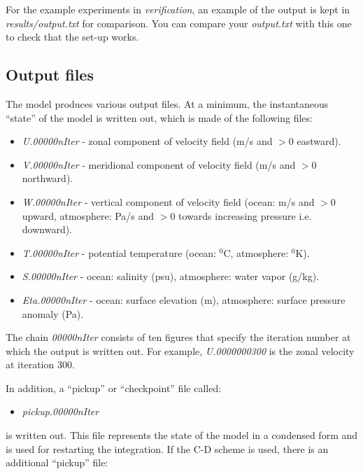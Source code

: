 For the example experiments in {\em verification}, an example of the
output is kept in {\em results/output.txt} for comparison. You can compare
your {\em output.txt} with this one to check that the set-up works.



\subsection{Output files}

The model produces various output files. At a minimum, the instantaneous
``state'' of the model is written out, which is made of the following files:

\begin{itemize}
\item \textit{U.00000nIter} - zonal component of velocity field (m/s and $>
0 $ eastward).

\item \textit{V.00000nIter} - meridional component of velocity field (m/s
and $> 0$ northward).

\item \textit{W.00000nIter} - vertical component of velocity field (ocean:
m/s and $> 0$ upward, atmosphere: Pa/s and $> 0$ towards increasing pressure
i.e. downward).

\item \textit{T.00000nIter} - potential temperature (ocean: $^{0}$C,
atmosphere: $^{0}$K).

\item \textit{S.00000nIter} - ocean: salinity (psu), atmosphere: water vapor
(g/kg).

\item \textit{Eta.00000nIter} - ocean: surface elevation (m), atmosphere:
surface pressure anomaly (Pa).
\end{itemize}

The chain \textit{00000nIter} consists of ten figures that specify the
iteration number at which the output is written out. For example, \textit{%
U.0000000300} is the zonal velocity at iteration 300.

In addition, a ``pickup'' or ``checkpoint'' file called:

\begin{itemize}
\item \textit{pickup.00000nIter}
\end{itemize}

is written out. This file represents the state of the model in a condensed
form and is used for restarting the integration. If the C-D scheme is used,
there is an additional ``pickup'' file:


